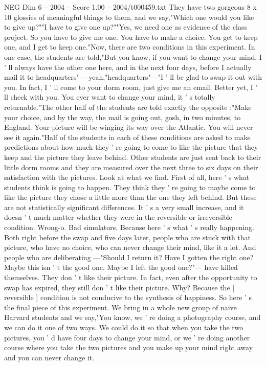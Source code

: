 \begin{textsample}{NEG Dim 6 – 2004 – Score 1.00 – 2004/t000459.txt}
They have two gorgeous 8 x 10 glossies of meaningful things to them, and we say,"Which one would you like to give up?""I have to give one up?""Yes, we need one as evidence of the class project.
So you have to give me one.
You have to make a choice.
You get to keep one, and I get to keep one."Now, there are two conditions in this experiment.
In one case, the students are told,"But you know, if you want to change your mind, I ' ll always have the other one here, and in the next four days, before I actually mail it to headquarters"— yeah,"headquarters"—"I ' ll be glad to swap it out with you.
In fact, I ' ll come to your dorm room, just give me an email.
Better yet, I ' ll check with you.
You ever want to change your mind, it ' s totally returnable."The other half of the students are told exactly the opposite :"Make your choice, and by the way, the mail is going out, gosh, in two minutes, to England.
Your picture will be winging its way over the Atlantic.
You will never see it again."Half of the students in each of these conditions are asked to make predictions about how much they ' re going to come to like the picture that they keep and the picture they leave behind.
Other students are just sent back to their little dorm rooms and they are measured over the next three to six days on their satisfaction with the pictures.
Look at what we find.
First of all, here ' s what students think is going to happen.
They think they ' re going to maybe come to like the picture they chose a little more than the one they left behind.
But these are not statistically significant differences.
It ' s a very small increase, and it doesn ' t much matter whether they were in the reversible or irreversible condition.
Wrong-o.
Bad simulators.
Because here ' s what ' s really happening.
Both right before the swap and five days later, people who are stuck with that picture, who have no choice, who can never change their mind, like it a lot.
And people who are deliberating —"Should I return it?
Have I gotten the right one?
Maybe this isn ' t the good one.
Maybe I left the good one?"— have killed themselves.
They don ' t like their picture.
In fact, even after the opportunity to swap has expired, they still don ' t like their picture.
Why?
Because the [ reversible ] condition is not conducive to the synthesis of happiness.
So here ' s the final piece of this experiment.
We bring in a whole new group of naive Harvard students and we say,"You know, we ' re doing a photography course, and we can do it one of two ways.
We could do it so that when you take the two pictures, you ' d have four days to change your mind, or we ' re doing another course where you take the two pictures and you make up your mind right away and you can never change it.

\end{textsample}
